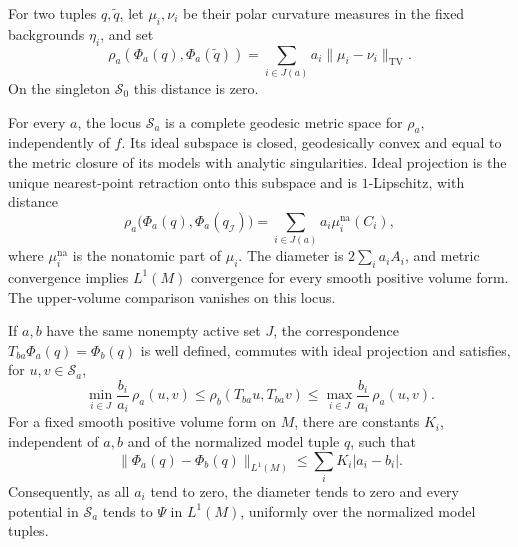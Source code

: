 For two tuples $q,\widetilde q$, let $\mu_i,\nu_i$ be their polar curvature measures in the fixed backgrounds $\eta_i$, and set
\begin{equation}\label{eq:weighted-product-polar-metric}
 \rho_a(\Phi_a(q),\Phi_a(\widetilde q))
       =\sum_{i\in J(a)}a_i\|\mu_i-\nu_i\|_{\mathrm{TV}}.
\end{equation}
On the singleton $\mathcal S_0$ this distance is zero.

\begin{proposition}\label{prop:weighted-product-polar-metric}
For every $a$, the locus $\mathcal S_a$ is a complete geodesic metric space for $\rho_a$, independently of $f$. Its ideal subspace is closed, geodesically convex and equal to the metric closure of its models with analytic singularities. Ideal projection is the unique nearest-point retraction onto this subspace and is $1$-Lipschitz, with distance
\[
 \rho_a\bigl(\Phi_a(q),\Phi_a(q_{\mathcal I})\bigr)
       =\sum_{i\in J(a)}a_i\mu_i^{\mathrm{na}}(C_i),
\]
where $\mu_i^{\mathrm{na}}$ is the nonatomic part of $\mu_i$. The diameter is $2\sum_i a_iA_i$, and metric convergence implies $L^1(M)$ convergence for every smooth positive volume form. The upper-volume comparison vanishes on this locus.

If $a,b$ have the same nonempty active set $J$, the correspondence $T_{ba}\Phi_a(q)=\Phi_b(q)$ is well defined, commutes with ideal projection and satisfies, for $u,v\in\mathcal S_a$,
\[
 \min_{i\in J}\frac{b_i}{a_i}\,\rho_a(u,v)
 \leq\rho_b(T_{ba}u,T_{ba}v)
 \leq\max_{i\in J}\frac{b_i}{a_i}\,\rho_a(u,v).
\]
For a fixed smooth positive volume form on $M$, there are constants $K_i$, independent of $a,b$ and of the normalized model tuple $q$, such that
\[
 \|\Phi_a(q)-\Phi_b(q)\|_{L^1(M)}
       \leq\sum_i K_i|a_i-b_i|.
\]
Consequently, as all $a_i$ tend to zero, the diameter tends to zero and every potential in $\mathcal S_a$ tends to $\Psi$ in $L^1(M)$, uniformly over the normalized model tuples.
\end{proposition}
